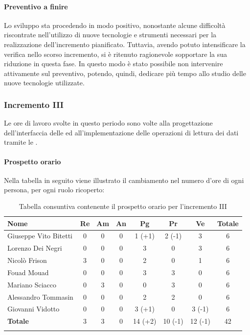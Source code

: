 		\paragraph{Preventivo a finire}
			Lo sviluppo sta procedendo in modo positivo, nonostante alcune difficoltà riscontrate nell'utilizzo di nuove tecnologie e strumenti necessari per la realizzazione dell'incremento pianificato.
			\newline
			Tuttavia, avendo potuto intensificare la verifica nello scorso incremento, si è ritenuto ragionevole sopportare la sua riduzione in questa fase. In questo modo è stato possibile non intervenire attivamente sul preventivo, potendo, quindi, dedicare più tempo allo studio delle nuove tecnologie utilizzate.

		
		\subsubsection{Incremento III }
		Le ore di lavoro svolte in questo periodo sono volte alla progettazione dell'interfaccia delle  ed all'implementazione delle operazioni di lettura dei dati tramite le .
		\paragraph{Prospetto orario}
			Nella tabella in seguito viene illustrato il cambiamento nel numero d'ore di ogni persona, per ogni ruolo ricoperto:
			
			\begin{longtable}{|l|c|c|c|c|c|c|c|}
				\hline
				\rowcolor{lighter-grayer}
				\textbf{Nome} & \textbf{Re} & \textbf{Am} & \textbf{An} & \textbf{Pg}  & \textbf{Pr}   & \textbf{Ve} & \textbf{Totale} \\
				\hline
				\endfirsthead
				\hline
				Giuseppe Vito Bitetti & 0 & 0 & 0 & 1 (+1) & 2 (-1) & 3 & 6\\
				\hline
				\hline
				Lorenzo Dei Negri & 0 & 0 & 0 & 3 & 0 & 3 & 6\\
				\hline
				\hline
				Nicolò Frison & 3 & 0 & 0 & 2 & 0 & 1 & 6 \\
				\hline
				\hline
				Fouad Mouad & 0 & 0 & 0 & 3 & 3 & 0 & 6\\
				\hline
				\hline
				Mariano Sciacco & 0 & 3 & 0 & 0 & 3 & 0 & 6 \\
				\hline
				\hline
				Alessandro Tommasin & 0 & 0 & 0 & 2 & 2 & 0 & 6\\
				\hline
				\hline
				Giovanni Vidotto & 0 & 0 & 0 & 3 (+1) & 0 & 3 (-1) & 6 \\
				\hline 
				\textbf{Totale} & 3 &  3 & 0 & 14 (+2) & 10 (-1) & 12 (-1) & 42 \\
				\hline 
				
				\caption{Tabella consuntiva contenente il prospetto orario per l'incremento III}
			\end{longtable}
			\pagebreak
			
